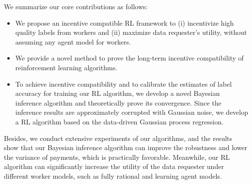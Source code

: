 


We summarize our core contributions as follows:
\begin{itemize}[topsep=0pt,  itemsep=0pt]
\item We propose an incentive compatible RL framework to (i) incentivize high quality labels from workers and (ii) maximize data requester's utility, without assuming any agent model for workers.  
\item We provide a novel method to prove the long-term incentive compatibility of reinforcement learning algorithms.
\item To achieve incentive compatibility and to calibrate the estimates of label accuracy for training our RL algorithm, we develop a novel Bayesian inference algorithm and theoretically prove its convergence. Since the inference results are approximately corrupted with Gaussian noise, we develop a RL algorithm based on the data-driven Gaussian process regression. 
\end{itemize}
Besides, we conduct extensive experiments of our algorithms, and the results show that our Bayesian inference algorithm can improve the robustness and lower the variance of payments, which is practically favorable. Meanwhile, our RL algorithm can significantly increase the utility of the data requester under different worker models, such as fully rational and learning agent models. 

